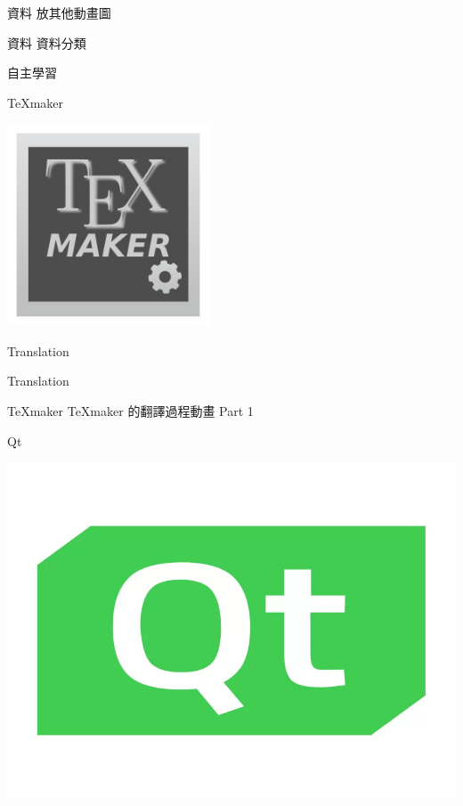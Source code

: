 \newpage
\begin{mainpage}{2}{資料}
放其他動畫圖
\end{mainpage}
\newpage
\begin{mainpage}{2}{資料}
資料分類
\end{mainpage}
\newpage
{}
\newpage
{}
\newpage
\begin{tikzpage}{3}{自主學習}
\vfill
{}
\end{tikzpage}
\newpage
\begin{mainpage}{3}{TeXmaker}
\begin{center}
\includegraphics[width = 60mm]{動畫測試/texmaker_icon.jpg}
\end{center}
\end{mainpage}
\newpage
\begin{mainpage}{3}{Translation}
\end{mainpage}
\newpage
\begin{mainpage}{3}{Translation}
\end{mainpage}
\newpage
\begin{mainpage}{3}{TeXmaker}
TeXmaker 的翻譯過程動畫 Part 1
\end{mainpage}
\newpage
\begin{mainpage}{3}{Qt}
\begin{center}
\includegraphics[width = 90 mm]{動畫測試/qt.jpeg}
\end{center}
\end{mainpage}

